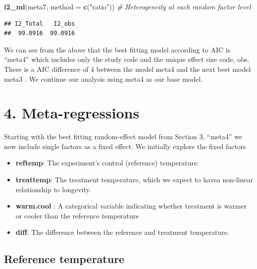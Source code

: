 \documentclass[
]{article}
\newenvironment{Shaded}{\begin{snugshade}}{\end{snugshade}}
\newcommand{\AttributeTok}[1]{\textcolor[rgb]{0.13,0.29,0.53}{#1}}
\newcommand{\CommentTok}[1]{\textcolor[rgb]{0.56,0.35,0.01}{\textit{#1}}}
\newcommand{\FunctionTok}[1]{\textcolor[rgb]{0.13,0.29,0.53}{\textbf{#1}}}
\newcommand{\NormalTok}[1]{#1}
\newcommand{\StringTok}[1]{\textcolor[rgb]{0.31,0.60,0.02}{#1}}
\begin{document}
\begin{Shaded}
\begin{Highlighting}[]
\FunctionTok{i2\_ml}\NormalTok{(meta7, }\AttributeTok{method =} \FunctionTok{c}\NormalTok{(}\StringTok{"ratio"}\NormalTok{))  }\CommentTok{\# Heterogeneity at each random factor level}
\end{Highlighting}
\end{Shaded}

\begin{verbatim}
## I2_Total   I2_obs 
##  99.0916  99.0916
\end{verbatim}

We can see from the above that the best fitting model according to AIC
is ``meta4'' which includes only the study code and the unique effect
size code, obs. There is a AIC difference of 4 between the model meta4
and the next best model meta3 . We continue our analysis using meta4 as
our base model.

\newpage

\hypertarget{meta-regressions}{%
\section{4. Meta-regressions}\label{meta-regressions}}

Starting with the best fitting random-effect model from Section 3,
``meta4'' we now include single factors as a fixed effect. We initially
explore the fixed factors

\begin{itemize}
\item
  \textbf{reftemp}: The experiment's control (reference) temperature.
\item
  \textbf{treattemp}: The treatment temperature, which we expect to
  havea non-linear relationship to longevity.
\item
  \textbf{warm.cool} : A categorical variable indicating whether
  treatment is warmer or cooler than the reference temperature
\item
  \textbf{diff}: The difference between the reference and treatment
  temperature.
\end{itemize}

\hypertarget{reference-temperature}{%
\subsection{Reference temperature}\label{reference-temperature}}
\end{document}
